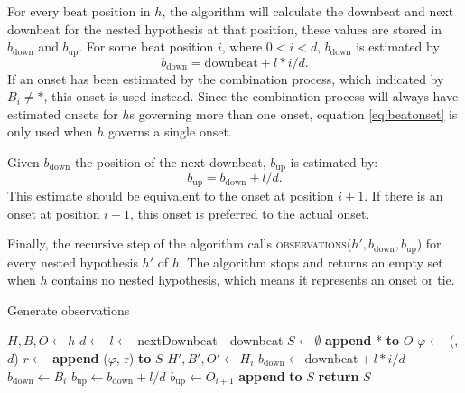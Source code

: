 For every beat position in $h$, the algorithm will calculate the downbeat and next downbeat for the nested hypothesis at that position, these values are stored in $b_{\mathrm{down}}$ and $b_{\mathrm{up}}$. 
For some beat position $i$, where $0 < i < d$, $b_{\mathrm{down}}$ is estimated by
\begin{equation}
\label{eq:beatonset}
b_{\mathrm{down}} = \mathrm{downbeat} + l * i/d.
\end{equation}
If an onset has been estimated by the combination process, which indicated by $B_i \neq *$, this onset is used instead. Since the combination process will always have estimated onsets for $h$s governing more than one onset, equation \ref{eq:beatonset} is only used when $h$ governs a single onset.

Given $b_{\mathrm{down}}$ the position of the next downbeat, $b_{\mathrm{up}}$ is estimated by:
\begin{equation}
b_{\mathrm{up}} = b_{\mathrm{down}} + l/d.
\end{equation}
This estimate should be equivalent to the onset at position $i+1$. If there is an onset at position $i+1$, this onset is preferred to the actual onset.

Finally, the recursive step of the algorithm calls \textsc{observations}($h', b_{\mathrm{down}}, b_{\mathrm{up}}$) for every nested hypothesis $h'$ of $h$. The algorithm stops and returns an empty set when $h$ contains no nested hypothesis, which means it represents an onset or tie.


\begin{algorithm}
\caption{Generate observations}
\label{alg:observations}
\begin{algorithmic}
	\State $H, B, O \leftarrow h$
	\State $d \leftarrow$ 
	\State $l \leftarrow$ nextDownbeat - downbeat
	\State $S \leftarrow \emptyset$
	\State \textbf{append} * \textbf{to} $O$
			\State $\varphi \leftarrow$ (, $d$)
			\State $r \leftarrow$ 
			\State \textbf{append} ($\varphi$, r) \textbf{to} $S$
		\EndIf	
		\State $H', B', O' \leftarrow H_i$
			\State $b_{\mathrm{down}} \leftarrow \mathrm{downbeat} + l * i/d$
				\State $b_{\mathrm{down}} \leftarrow B_i$
			\EndIf
			\State $b_{\mathrm{up}} \leftarrow b_{\mathrm{down}} + l/d$
				\State $b_{\mathrm{up}} \leftarrow O_{i+1}$
			\EndIf
			\State \textbf{append}  \textbf{to} $S$
		\EndIf
	\EndFor
	\State \textbf{return} $S$
\EndFunction
\end{algorithmic}
\end{algorithm}



